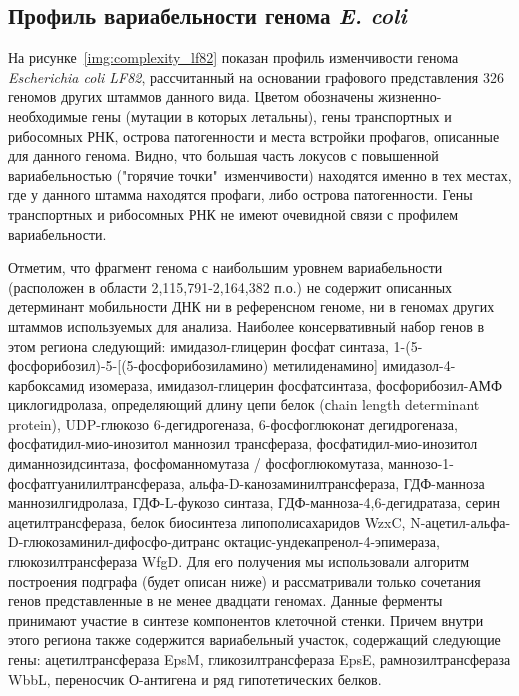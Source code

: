 \subsection{Профиль вариабельности генома \textit{E. coli}}
На рисунке~\ref{img:complexity_lf82} показан профиль изменчивости генома \textit{Escherichia coli LF82}, рассчитанный на основании графового представления 326 геномов других штаммов данного вида. Цветом обозначены жизненно-необходимые гены (мутации в которых летальны), гены транспортных и рибосомных РНК, острова патогенности и места встройки профагов, описанные для данного генома. Видно, что большая часть локусов с повышенной вариабельностью ("горячие точки"\ изменчивости) находятся именно в тех местах, где у данного штамма находятся профаги, либо острова патогенности. Гены транспортных и рибосомных РНК не имеют очевидной связи с профилем вариабельности. 

Отметим, что фрагмент генома с наибольшим уровнем вариабельности (расположен в области 2,115,791-2,164,382 п.о.) не содержит описанных детерминант мобильности ДНК ни в референсном геноме, ни в геномах других штаммов используемых для анализа. Наиболее консервативный набор генов в этом региона следующий: имидазол-глицерин фосфат синтаза, 1-(5-фосфорибозил)-5-[(5-фосфорибозиламино) метилиденамино] имидазол-4-карбоксамид изомераза, имидазол-глицерин фосфатсинтаза, фосфорибозил-АМФ циклогидролаза, определяющий длину цепи белок (сhain length determinant protein), UDP-глюкозо 6-дегидрогеназа, 6-фосфоглюконат дегидрогеназа, фосфатидил-мио-инозитол маннозил трансфераза, фосфатидил-мио-инозитол диманнозидсинтаза, фосфоманномутаза / фосфоглюкомутаза, маннозо-1-фосфатгуанилилтрансфераза, альфа-D-канозаминилтрансфераза, ГДФ-манноза маннозилгидролаза, ГДФ-L-фукозо синтаза, ГДФ-манноза-4,6-дегидратаза, серин ацетилтрансфераза, белок биосинтеза липополисахаридов WzxC, N-ацетил-альфа-D-глюкозаминил-дифосфо-дитранс октацис-ундекапренол-4-эпимераза, глюкозилтрансфераза WfgD. Для его получения мы использовали алгоритм построения подграфа (будет описан ниже) и рассматривали только сочетания генов представленные в не менее двадцати геномах. Данные ферменты принимают участие в синтезе компонентов клеточной стенки. Причем внутри этого региона также содержится вариабельный участок, содержащий следующие гены: ацетилтрансфераза EpsM, гликозилтрансфераза EpsE, рамнозилтрансфераза WbbL, переносчик О-антигена и ряд гипотетических белков. 

